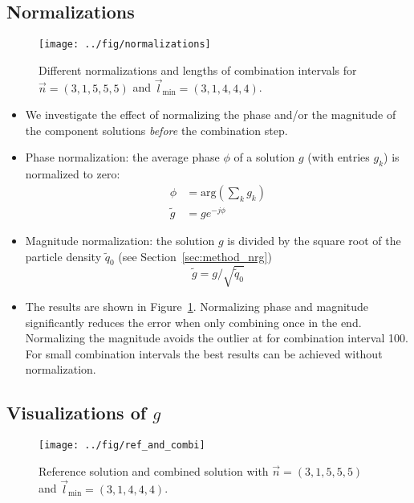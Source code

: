 \documentclass{scrartcl}
\newcommand{\lmin}{\vec{l}_{\text{min}}}
\begin{document}
\newpage

\subsection*{Normalizations}

\begin{figure}[h]
	\centering
	\texttt{[image: ../fig/normalizations]}
	\caption{Different normalizations and lengths of combination intervals for $\vec n = (3,1,5,5,5)$ and $\lmin = (3,1,4,4,4)$. }
	\label{fig:normalizations}
\end{figure}

\begin{itemize}
	\item We investigate the effect of normalizing the phase and/or the magnitude of the component solutions \textit{before} the combination step.
	
	\item Phase normalization: the average phase $\phi$ of a solution $g$ (with entries $g_k$) is normalized to zero:
	\begin{align*}
		\phi &= \text{arg}( \sum_k g_k ) \\
		\tilde{g} &= g e^{-j\phi}
	\end{align*}
	
	\item Magnitude normalization: the solution $g$ is divided by the square root of the particle density $\tilde{q}_0$ (see Section~\ref{sec:method_nrg})
	\begin{equation}
		\tilde{g} = g / \sqrt{\tilde{q}_0}
	\end{equation}
	
	\item The results are shown in Figure~\ref{fig:normalizations}. 
		Normalizing phase and magnitude significantly reduces the error when only combining once in the end.
		Normalizing the magnitude avoids the outlier at for combination interval 100.
		For small combination intervals the best results can be achieved without normalization.
	\end{itemize}	
		
\subsection*{Visualizations of $g$}

\begin{figure}[h]
	\centering
	\texttt{[image: ../fig/ref\_and\_combi]}
	\caption{Reference solution and combined solution with $\vec n = (3,1,5,5,5)$ and $\lmin = (3,1,4,4,4)$.}
	\label{fig:ref_and_combi}
\end{figure}
\end{document}
